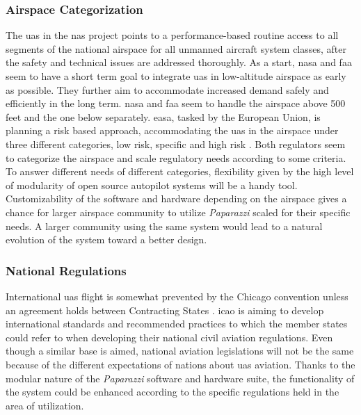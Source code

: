 \subsubsection{Airspace Categorization}
The \gls{uas} in the \gls{nas} project points to a performance-based routine access to all segments of the national airspace for all unmanned aircraft system classes, after the safety and technical issues are addressed thoroughly. As a start, \gls{nasa} and \gls{faa} seem to have a short term goal to integrate \gls{uas} in low-altitude airspace as early as possible. They further aim to accommodate increased demand safely and efficiently in the long term. \gls{nasa} and \gls{faa} seem to handle the airspace above 500 feet and the one below separately. \gls{easa}, tasked by the European Union, is planning a risk based approach, accommodating the \gls{uas} in the airspace under three different categories, low risk, specific and high risk \cite{A_NPA_EASA2015}. Both regulators seem to categorize the airspace and scale regulatory needs according to some criteria. To answer different needs of different categories, flexibility given by the high level of modularity of open source autopilot systems will be a handy tool. 
Customizability of the software and hardware depending on the airspace gives a chance for larger airspace community to utilize \emph{Paparazzi} scaled for their specific needs. A larger community using the same system would lead to a natural evolution of the system toward a better design.

\subsubsection{National Regulations}
International \gls{uas} flight is somewhat prevented by the Chicago convention unless an agreement holds between Contracting States \cite{A_NPA_EASA2015}. \gls{icao} is aiming to develop international standards and recommended practices to which the member states could refer to when developing their national civil aviation regulations. Even though a similar base is aimed, national aviation legislations will not be the same because of the different expectations of nations about \gls{uas} aviation. Thanks to the modular nature of the \emph{Paparazzi} software and hardware suite, the functionality of the system could be enhanced according to the specific regulations held in the area of utilization.

